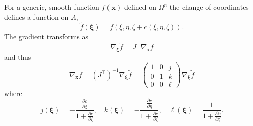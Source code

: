 \documentclass[letterpaper,final,12pt,reqno]{amsart}
\newcommand{\grad}{\nabla}
\newcommand{\bx}{\mathbf{x}}
\newcommand{\bxi}{\bm{\xi}}
\begin{document}
For a generic, smooth function $f(\bx)$ defined on $\Omega^n$ the change of coordinates defines a function on $\Lambda$,
    $$\tilde f(\bxi) = f(\xi,\eta,\zeta+c(\xi,\eta,\zeta)).$$
The gradient transforms as
\begin{equation}
\grad_{\bxi} \tilde f = J^\top \grad_{\bx} f
\end{equation}
and thus
\begin{equation}
\grad_{\bx} f = (J^\top)^{-1} \grad_{\bxi} \tilde f = \begin{pmatrix} 1 & 0 & j \\ 0 & 1 & k \\ 0 & 0 & \ell \end{pmatrix} \grad_{\bxi} \tilde f \label{changederivatives}
\end{equation}
where
\begin{equation}
j(\bxi) = -\frac{\frac{\partial c}{\partial \xi}}{1+\frac{\partial c}{\partial \zeta}}, \quad k(\bxi) = -\frac{\frac{\partial c}{\partial \eta}}{1+\frac{\partial c}{\partial \zeta}}, \quad \ell(\bxi) = \frac{1}{1+\frac{\partial c}{\partial \zeta}}. \label{definejkl}
\end{equation}
\end{document}
